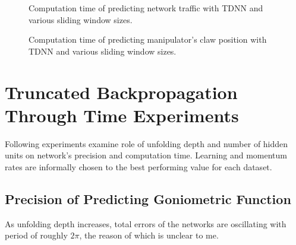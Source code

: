 \documentclass[12pt,oneside]{fithesis2}
\begin{document}
\begin{figure}[H]
\centering
\caption{Computation time of predicting network traffic with TDNN and various sliding window sizes.}
\end{figure}


\begin{figure}[H]
\centering
\caption{Computation time of predicting manipulator's claw position with TDNN and various sliding window sizes.}
\end{figure}

\section{Truncated Backpropagation Through Time Experiments}
Following experiments examine role of unfolding depth and number of hidden units on network's precision and computation time. Learning and momentum rates are informally chosen to the best performing value for each dataset.

\subsection{Precision of Predicting Goniometric Function}
As unfolding depth increases, total errors of the networks are oscillating with period of roughly $2\pi$, the reason of which is unclear to me.
\end{document}
